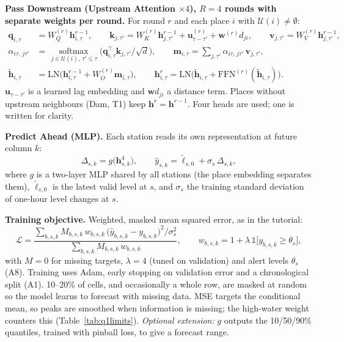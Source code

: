 \textbf{Pass Downstream (Upstream Attention $\times4$), $R=4$ rounds with separate weights per round.} For round $r$ and each place $i$ with $\mathcal U(i)\neq\emptyset$:
\begin{align}
\mathbf q_{i,\tau} &= W_Q^{(r)}\mathbf h^{r-1}_{i,\tau}, \qquad
\mathbf k_{j,\tau'} = W_K^{(r)}\mathbf h^{r-1}_{j,\tau'} + \mathbf u^{(r)}_{\tau-\tau'} + \mathbf w^{(r)} d_{ji}, \qquad
\mathbf v_{j,\tau'} = W_V^{(r)}\mathbf h^{r-1}_{j,\tau'},\\
\alpha_{i\tau,\,j\tau'} &= \operatorname*{softmax}_{\,j\in\mathcal U(i),\ \tau'\le\tau}\!\Big(\mathbf q_{i,\tau}^{\top}\mathbf k_{j,\tau'}/\sqrt d\Big), \qquad
\mathbf m_{i,\tau} = \textstyle\sum_{j,\tau'}\alpha_{i\tau,\,j\tau'}\,\mathbf v_{j,\tau'},\\
\tilde{\mathbf h}_{i,\tau} &= \mathrm{LN}\big(\mathbf h^{r-1}_{i,\tau} + W_O^{(r)}\mathbf m_{i,\tau}\big), \qquad
\mathbf h^{r}_{i,\tau} = \mathrm{LN}\big(\tilde{\mathbf h}_{i,\tau} + \mathrm{FFN}^{(r)}(\tilde{\mathbf h}_{i,\tau})\big).
\end{align}
$\mathbf u_{\tau-\tau'}$ is a learned lag embedding and $\mathbf w d_{ji}$ a distance term. Places without upstream neighbours (Dam, T1) keep $\mathbf h^{r}=\mathbf h^{r-1}$. Four heads are used; one is written for clarity.

\textbf{Predict Ahead (MLP).} Each station reads its own representation at future column $k$:
\begin{equation}
\Delta_{s,k} = g\big(\mathbf h^{4}_{s,k}\big), \qquad \hat y_{s,k} = \tilde\ell_{s,0} + \sigma_s\,\Delta_{s,k},
\end{equation}
where $g$ is a two-layer MLP shared by all stations (the place embedding separates them), $\tilde\ell_{s,0}$ is the latest valid level at $s$, and $\sigma_s$ the training standard deviation of one-hour level changes at $s$.

\textbf{Training objective.} Weighted, masked mean squared error, as in the tutorial:
\begin{equation}
\mathcal L = \frac{\sum_{b,s,k} M_{b,s,k}\,w_{b,s,k}\,\big(\hat y_{b,s,k}-y_{b,s,k}\big)^2/\sigma_s^2}{\sum_{b,s,k} M_{b,s,k}\,w_{b,s,k}}, \qquad
w_{b,s,k} = 1 + \lambda\,\mathbb 1\big[y_{b,s,k}\ge\theta_s\big],
\end{equation}
with $M=0$ for missing targets, $\lambda=4$ (tuned on validation) and alert levels $\theta_s$ (A8). Training uses Adam, early stopping on validation error and a chronological split (A1). 10--20\% of cells, and occasionally a whole row, are masked at random so the model learns to forecast with missing data. MSE targets the conditional mean, so peaks are smoothed when information is missing; the high-water weight counters this (Table~\ref{tab:q1limits}). \emph{Optional extension:} $g$ outputs the 10/50/90\% quantiles, trained with pinball loss, to give a forecast range.

